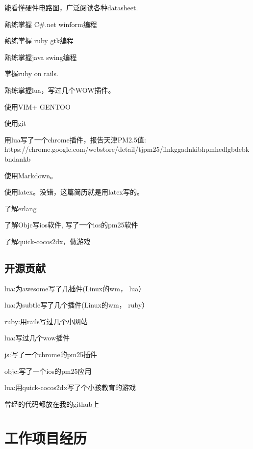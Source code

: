 \documentclass[titlepage]{article}
\begin{document}
\begin{compactitem}
    \item 能看懂硬件电路图，广泛阅读各种datasheet. 
    \item 熟练掌握 C\#.net winform编程
    \item 熟练掌握 ruby gtk编程
    \item 熟练掌握java swing编程 
    \item 掌握ruby on rails.
    \item 熟练掌握lua，写过几个WOW插件。
    \item 使用VIM+ GENTOO
    \item 使用git
    \item 用lua写了一个chrome插件，报告天津PM2.5值: https://chrome.google.com/webstore/detail/tjpm25/ilnkggadnkibhpmhedlgbdebkbndankb
    \item 使用Markdown。
    \item 使用latex。没错，这篇简历就是用latex写的。
    \item 了解erlang
    \item 了解Objc写ios软件, 写了一个ios的pm25软件
    \item 了解quick-cocos2dx，做游戏
\end{compactitem}


\subsection{开源贡献}


\begin{compactitem}
    \item lua:为awesome写了几插件(Linux的wm， lua）
    \item lua:为subtle写了几个插件(Linux的wm， ruby）
    \item ruby:用rails写过几个小网站
    \item lua:写过几个wow插件
    \item js:写了一个chrome的pm25插件
    \item objc:写了一个ios的pm25应用
    \item lua:用quick-cocos2dx写了个小孩教育的游戏
    \item 曾经的代码都放在我的github上
\end{compactitem}



\section{工作项目经历}
\end{document}
